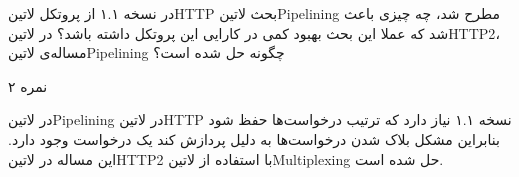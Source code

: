 \documentclass[../main.tex]{subfiles}
\begin{document}

در نسخه ۱.۱ از پروتکل ‌لاتین{HTTP} بحث ‌لاتین{Pipelining} مطرح شد، چه چیزی باعث شد که عملا این بحث بهبود کمی در کارایی این پروتکل داشته باشد؟
در ‌لاتین{HTTP2}، مساله‌ی ‌لاتین{Pipelining} چگونه حل شده است؟

۲ نمره

\begin{answer}

در ‌لاتین{Pipelining} در ‌لاتین{HTTP} نسخه ۱.۱ نیاز دارد که ترتیب درخواست‌ها حفظ شود بنابراین مشکل بلاک شدن درخواست‌ها به دلیل پردازش کند یک درخواست
وجود دارد. این مساله در ‌لاتین{HTTP2} با استفاده از ‌لاتین{Multiplexing} حل شده است.

\end{answer}
\end{document}
